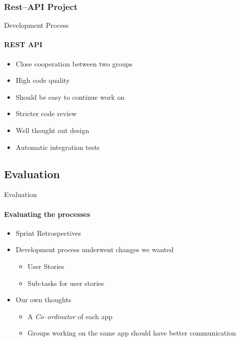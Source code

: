 	\subsubsection{Rest--API Project}
		\begin{frame}[t]{Development Process}\framesubtitle{REST API}
	
    \begin{itemize}
        \item Close cooperation between two groups
        \item High code quality
        \item Should be easy to continue work on
        \item Stricter code review
        \item Well thought out design
        \item Automatic integration tests
    \end{itemize}
	\end{frame}

	\subsection{Evaluation}
		\begin{frame}[t]{Evaluation}\framesubtitle{Evaluating the processes}
	
    \begin{itemize}
        \item Sprint Retrospectives
        \item Development process underwent changes we wanted
        \begin{itemize}
        	\item User Stories
        	\item Sub-tasks for user stories
        \end{itemize}
        \item Our own thoughts
        	\begin{itemize}
        		\item A \textit{Co--ordinator} of each app
        		\item Groups working on the same app should have better communication
        	\end{itemize}
    \end{itemize}
	\end{frame}